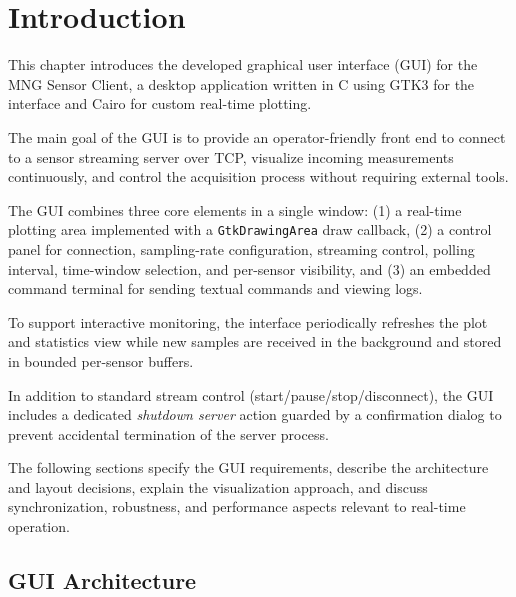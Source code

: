 
















\section{Introduction}
This chapter introduces the developed graphical user interface (GUI) for the MNG Sensor Client, a desktop application written in C using GTK3 for the interface and Cairo for custom real-time plotting.

The main goal of the GUI is to provide an operator-friendly front end to connect to a sensor streaming server over TCP, visualize incoming measurements continuously, and control the acquisition process without requiring external tools.

The GUI combines three core elements in a single window: (1) a real-time plotting area implemented with a \texttt{GtkDrawingArea} draw callback, (2) a control panel for connection, sampling-rate configuration, streaming control, polling interval, time-window selection, and per-sensor visibility, and (3) an embedded command terminal for sending textual commands and viewing logs.

To support interactive monitoring, the interface periodically refreshes the plot and statistics view while new samples are received in the background and stored in bounded per-sensor buffers.

In addition to standard stream control (start/pause/stop/disconnect), the GUI includes a dedicated \textit{shutdown server} action guarded by a confirmation dialog to prevent accidental termination of the server process.​

The following sections specify the GUI requirements, describe the architecture and layout decisions, explain the visualization approach, and discuss synchronization, robustness, and performance aspects relevant to real-time operation.

\subsection{GUI Architecture}

